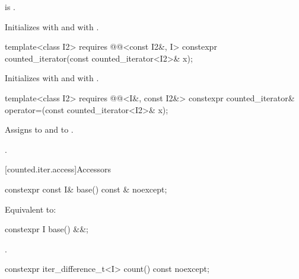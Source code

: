 \begin{itemdescr}
\pnum
\hardexpects
{} is .

\pnum
\effects
Initializes  with  and
 with .
\end{itemdescr}

%
\begin{itemdecl}
template<class I2>
  requires @@<const I2&, I>
    constexpr counted_iterator(const counted_iterator<I2>& x);
\end{itemdecl}

\begin{itemdescr}
\pnum
\effects
Initializes  with  and
 with .
\end{itemdescr}

%
\begin{itemdecl}
template<class I2>
  requires @@<I&, const I2&>
    constexpr counted_iterator& operator=(const counted_iterator<I2>& x);
\end{itemdecl}

\begin{itemdescr}
\pnum
\effects
Assigns  to  and
 to .

\pnum
\returns
{}.
\end{itemdescr}

[counted.iter.access]{Accessors}

%
\begin{itemdecl}
constexpr const I& base() const & noexcept;
\end{itemdecl}

\begin{itemdescr}
\pnum
\effects
Equivalent to: 
\end{itemdescr}

%
\begin{itemdecl}
constexpr I base() &&;
\end{itemdecl}

\begin{itemdescr}
\pnum
\returns
{}.
\end{itemdescr}

%
\begin{itemdecl}
constexpr iter_difference_t<I> count() const noexcept;
\end{itemdecl}

